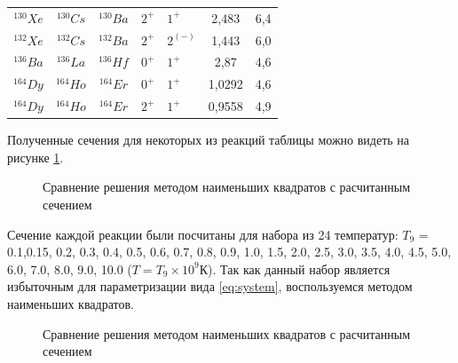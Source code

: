 \documentclass[14pt, a4paper]{article}
\begin{document}
\begin{table}
\begin{tabular}{|c|c|c|HHc|c|}
		$^{130}Xe$ & $^{130}Cs$ &$^{130}Ba$& $2^+$  &  $1^+$  & 2,483 &   6,4   \\
		$^{132}Xe$ & $^{132}Cs$ &$^{132}Ba$& $2^+$  &  $2^{(-)}$  & 1,443 &   6,0   \\
		$^{136}Ba$ & $^{136}La$ &$^{136}Hf$& $0^+$  &  $1^+$  & 2,87 &   4,6   \\
		$^{164}Dy$ & $^{164}Ho$ &$^{164}Er$& $0^+$  &  $1^+$  & 1,0292 &   4,6   \\
		$^{164}Dy$ & $^{164}Ho$ &$^{164}Er$& $2^+$  &  $1^+$  & 0,9558 &   4,9   \\
		\hline
	\end{tabular}
	\label{Tels}
\end{table}

Полученные сечения для некоторых из реакций таблицы можно видеть на рисунке \ref{ris:sigma-full}.

\begin{figure}[ht]
	\caption{Сравнение решения методом наименьших квадратов с расчитанным сечением}
	\label{ris:sigma-full}
\end{figure}

Сечение каждой реакции были посчитаны для набора из 24 температур: $T_9$ = 0.1,0.15, 0.2, 0.3, 0.4, 0.5, 0.6, 0.7, 0.8, 0.9, 1.0, 1.5, 2.0, 2.5, 3.0, 3.5, 4.0, 4.5, 5.0, 6.0, 7.0, 8.0, 9.0, 10.0 ($T = T_9 \times 10^{9}\text{К}$). Так как данный набор является избыточным для параметризации вида \ref{eq:system}, воспользуемся методом наименьших квадратов. 

\begin{figure}[ht]
	\caption{Сравнение решения методом наименьших квадратов с расчитанным сечением}
	\label{ris:2}
\end{figure}
\end{document}
